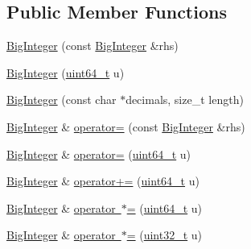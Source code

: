 \subsection*{Public Member Functions}
\begin{DoxyCompactItemize}
\item 
\mbox{\hyperlink{classrapidjson_1_1internal_1_1_big_integer_a062d319ca53cf00c0ca9b52fbaf4976d}{Big\+Integer}} (const \mbox{\hyperlink{classrapidjson_1_1internal_1_1_big_integer}{Big\+Integer}} \&rhs)
\item 
\mbox{\hyperlink{classrapidjson_1_1internal_1_1_big_integer_aa181bc80ab4638c4eec147cac1516d4e}{Big\+Integer}} (\mbox{\hyperlink{stdint_8h_aec6fcb673ff035718c238c8c9d544c47}{uint64\+\_\+t}} u)
\item 
\mbox{\hyperlink{classrapidjson_1_1internal_1_1_big_integer_a8a62a7693c0ac5f0394557ad36449e1f}{Big\+Integer}} (const char $\ast$decimals, size\+\_\+t length)
\item 
\mbox{\hyperlink{classrapidjson_1_1internal_1_1_big_integer}{Big\+Integer}} \& \mbox{\hyperlink{classrapidjson_1_1internal_1_1_big_integer_a578cf1ad8e1e0bfedf2dc9be73562a31}{operator=}} (const \mbox{\hyperlink{classrapidjson_1_1internal_1_1_big_integer}{Big\+Integer}} \&rhs)
\item 
\mbox{\hyperlink{classrapidjson_1_1internal_1_1_big_integer}{Big\+Integer}} \& \mbox{\hyperlink{classrapidjson_1_1internal_1_1_big_integer_acb27796a1f617fc8ca1734852f9049e7}{operator=}} (\mbox{\hyperlink{stdint_8h_aec6fcb673ff035718c238c8c9d544c47}{uint64\+\_\+t}} u)
\item 
\mbox{\hyperlink{classrapidjson_1_1internal_1_1_big_integer}{Big\+Integer}} \& \mbox{\hyperlink{classrapidjson_1_1internal_1_1_big_integer_ab313deab130f74afda260cbc7f150c56}{operator+=}} (\mbox{\hyperlink{stdint_8h_aec6fcb673ff035718c238c8c9d544c47}{uint64\+\_\+t}} u)
\item 
\mbox{\hyperlink{classrapidjson_1_1internal_1_1_big_integer}{Big\+Integer}} \& \mbox{\hyperlink{classrapidjson_1_1internal_1_1_big_integer_aaaa5b1b2600d4de61f8303c516376925}{operator $\ast$=}} (\mbox{\hyperlink{stdint_8h_aec6fcb673ff035718c238c8c9d544c47}{uint64\+\_\+t}} u)
\item 
\mbox{\hyperlink{classrapidjson_1_1internal_1_1_big_integer}{Big\+Integer}} \& \mbox{\hyperlink{classrapidjson_1_1internal_1_1_big_integer_aa0861877d91cc136b1a96d821acc335e}{operator $\ast$=}} (\mbox{\hyperlink{stdint_8h_a435d1572bf3f880d55459d9805097f62}{uint32\+\_\+t}} u)
\item 

\end{DoxyCompactItemize}
